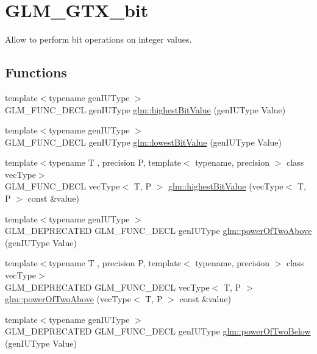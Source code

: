 \hypertarget{group__gtx__bit}{}\section{G\+L\+M\+\_\+\+G\+T\+X\+\_\+bit}
\label{group__gtx__bit}


Allow to perform bit operations on integer values.  


\subsection*{Functions}
\begin{DoxyCompactItemize}
\item 
{\footnotesize template$<$typename gen\+I\+U\+Type $>$ }\\G\+L\+M\+\_\+\+F\+U\+N\+C\+\_\+\+D\+E\+CL gen\+I\+U\+Type \hyperlink{group__gtx__bit_ga0dcc8fe7c3d3ad60dea409281efa3d05}{glm\+::highest\+Bit\+Value} (gen\+I\+U\+Type Value)
\item 
{\footnotesize template$<$typename gen\+I\+U\+Type $>$ }\\G\+L\+M\+\_\+\+F\+U\+N\+C\+\_\+\+D\+E\+CL gen\+I\+U\+Type \hyperlink{group__gtx__bit_ga2ff6568089f3a9b67f5c30918855fc6f}{glm\+::lowest\+Bit\+Value} (gen\+I\+U\+Type Value)
\item 
{\footnotesize template$<$typename T , precision P, template$<$ typename, precision $>$ class vec\+Type$>$ }\\G\+L\+M\+\_\+\+F\+U\+N\+C\+\_\+\+D\+E\+CL vec\+Type$<$ T, P $>$ \hyperlink{group__gtx__bit_ga5eea3a4d429040af13d39a7d7cd84d73}{glm\+::highest\+Bit\+Value} (vec\+Type$<$ T, P $>$ const \&value)
\item 
{\footnotesize template$<$typename gen\+I\+U\+Type $>$ }\\G\+L\+M\+\_\+\+D\+E\+P\+R\+E\+C\+A\+T\+ED G\+L\+M\+\_\+\+F\+U\+N\+C\+\_\+\+D\+E\+CL gen\+I\+U\+Type \hyperlink{group__gtx__bit_ga8cda2459871f574a0aecbe702ac93291}{glm\+::power\+Of\+Two\+Above} (gen\+I\+U\+Type Value)
\item 
{\footnotesize template$<$typename T , precision P, template$<$ typename, precision $>$ class vec\+Type$>$ }\\G\+L\+M\+\_\+\+D\+E\+P\+R\+E\+C\+A\+T\+ED G\+L\+M\+\_\+\+F\+U\+N\+C\+\_\+\+D\+E\+CL vec\+Type$<$ T, P $>$ \hyperlink{group__gtx__bit_gafe08808a50226b75b50e640a08b32ddc}{glm\+::power\+Of\+Two\+Above} (vec\+Type$<$ T, P $>$ const \&value)
\item 
{\footnotesize template$<$typename gen\+I\+U\+Type $>$ }\\G\+L\+M\+\_\+\+D\+E\+P\+R\+E\+C\+A\+T\+ED G\+L\+M\+\_\+\+F\+U\+N\+C\+\_\+\+D\+E\+CL gen\+I\+U\+Type \hyperlink{group__gtx__bit_ga3de7df63c589325101a2817a56f8e29d}{glm\+::power\+Of\+Two\+Below} (gen\+I\+U\+Type Value)

\end{DoxyCompactItemize}
